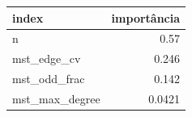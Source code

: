 \begin{tabular}{lr}
\hline
index & importância \\
\hline
n & 0.57 \\
mst\_edge\_cv & 0.246 \\
mst\_odd\_frac & 0.142 \\
mst\_max\_degree & 0.0421 \\
\hline
\end{tabular}
